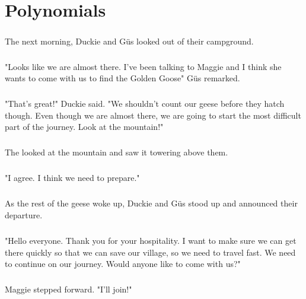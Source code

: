 \chapter{Polynomials}
\paragraph{} The next morning, Duckie and G{\"u}s looked out of their campground. 
\paragraph{} "Looks like we are almost there. I've been talking to Maggie and I think she wants to come with us to find the Golden Goose" G{\"u}s remarked.
\paragraph{} "That's great!" Duckie said. "We shouldn't count our geese before they hatch though. Even though we are almost there, we are going to start the most difficult part of the journey. Look at the mountain!"
\paragraph{} The looked at the mountain and saw it towering above them. 
\paragraph{} "I agree. I think we need to prepare."
\paragraph{} As the rest of the geese woke up, Duckie and G{\"u}s stood up and announced their departure. 
\paragraph{} "Hello everyone. Thank you for your hospitality. I want to make sure we can get there quickly so that we can save our village, so we need to travel fast. We need to continue on our journey. Would anyone like to come with us?"
\paragraph{} Maggie stepped forward. "I'll join!"

